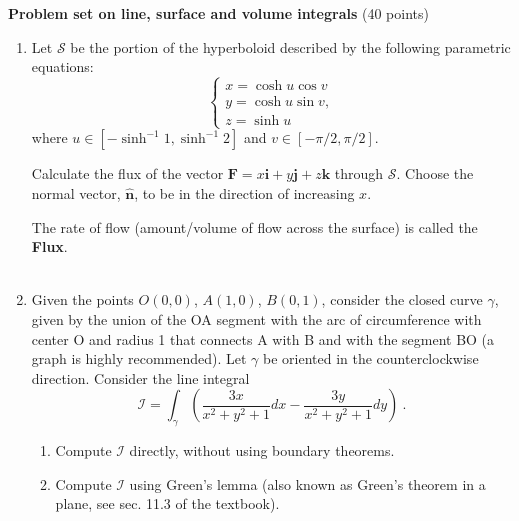 \documentclass[fleqn]{article}
\begin{document}
  \textbf{Problem set on line, surface and volume integrals} (40 points)
  \begin{enumerate}

    \item Let ${\mathcal S}$ be the portion of the hyperboloid 
    described by the following parametric equations:
    \begin{equation} 
      \begin{cases} 
      x = \cosh u \cos v  \nonumber \\
      y = \cosh u \sin v,  \nonumber \\
      z = \sinh u  \nonumber 
      \end{cases}
    \end{equation} 
    where $u \in \left[-\sinh^{-1} 1, \sinh^{-1} 2 \right]$ and $v \in \left[-\pi/2, \pi/2 \right]$. 
    
    Calculate the flux of the vector $\mathbf{F} = x\mathbf{i }+ y\mathbf{j }+ z\mathbf{k}$ through ${\mathcal S}$. Choose the normal vector, $\mathbf{\hat{n}}$, to be in the direction of increasing $x$.
    
      \textcolor{hwColor}{
        The rate of flow (amount/volume of flow across the surface) is called the \textbf{Flux}. \\
        \\
      }
    
    \item Given the points $O (0, 0)$, $A (1, 0)$, $B (0, 1)$, consider the closed curve $\gamma$, given by the union of the OA segment
    with the arc of circumference with center O and radius 1 that connects A with B and with the segment BO (a graph is highly recommended). Let $\gamma$ be oriented in the 
    counterclockwise direction. Consider the line integral
    $${\mathcal I} = \int_{\gamma} \left(\frac{3x}{x^2 + y^2 +1} dx-\frac{3y}{x^2 + y^2 +1} dy
       \right)~.
       $$
      \begin{enumerate}
        \item Compute  ${\mathcal I}$ directly, without using boundary theorems. 
        
        \item Compute  ${\mathcal I}$ using Green's lemma (also known as Green's theorem in a plane, see sec. 11.3 of the textbook). 
      \end{enumerate}
    

\end{enumerate}
\end{document}
